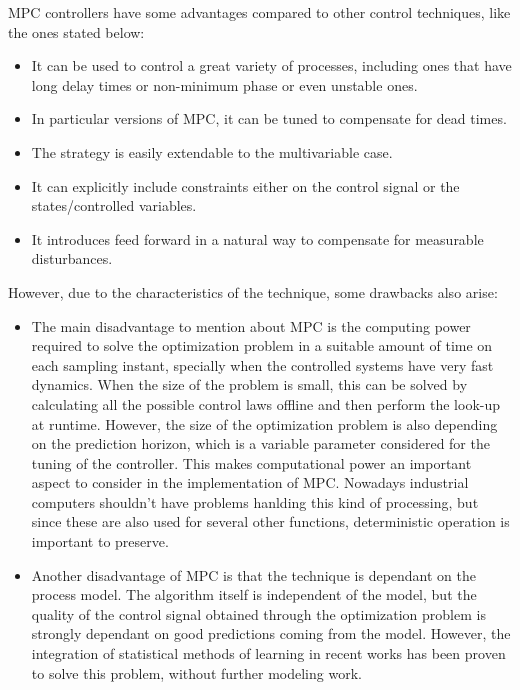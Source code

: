 MPC controllers have some advantages compared to other control techniques, like the ones stated below:

\begin{itemize}

\item It can be used to control a great variety of processes, including ones that have long delay times or non-minimum phase or even unstable ones. 

\item In particular versions of MPC, it can be tuned to compensate for dead times.

\item The strategy is easily extendable to the multivariable case.

\item It can explicitly include constraints either on the control signal or the states/controlled variables.

\item It introduces feed forward in a natural way to compensate for measurable disturbances.

\end{itemize}

However, due to the characteristics of the technique, some drawbacks also arise:

\begin{itemize}

\item The main disadvantage to mention about MPC is the computing power required to solve the optimization problem in a suitable amount of time on each sampling instant, specially when the controlled systems have very fast dynamics. When the size of the problem is small, this can be solved by calculating all the possible control laws offline and then perform the look-up at runtime. However, the size of the optimization problem is also depending on the prediction horizon, which is a variable parameter considered for the tuning of the controller. This makes computational power an important aspect to consider in the implementation of MPC. Nowadays industrial computers shouldn't have problems hanlding this kind of processing, but since these are also used for several other functions, deterministic operation is important to preserve.

\item Another disadvantage of MPC is that the technique is dependant on the process model. The algorithm itself is independent of the model, but the quality of the control signal obtained through the optimization problem is strongly dependant on good predictions coming from the model. However, the integration of statistical methods of learning in recent works \cite{Bouffard2012} has been proven to solve this problem, without further modeling work.

\end{itemize}

